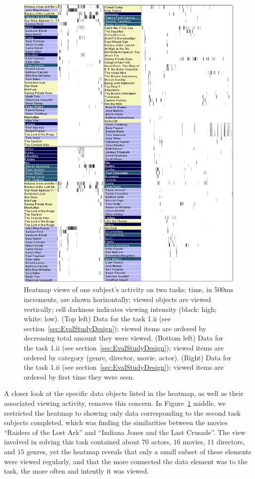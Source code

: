 \begin{figure}[!hbtp]
  \centering
  \includegraphics[width=0.75\linewidth]{images/heatmaps.eps}
  \caption{Heatmap views of one subject's activity on two tasks; time, in 500ms increments, are shown horizontally; viewed objects are viewed vertically; cell darkness indicates viewing intensity (black: high; white: low). (Top left) Data for the task 1.ii (see section~\ref{sec:EvalStudyDesign}); viewed items are ordered by decreasing total amount they were viewed. (Bottom left) Data for the task 1.ii (see section~\ref{sec:EvalStudyDesign}); viewed items are ordered by category (genre, director, movie, actor). (Right) Data for the task 1.ii (see section~\ref{sec:EvalStudyDesign}); viewed items are ordered by first time they were seen. 
}
	\label{fig:heatmap}
\end{figure}


A closer look at the specific data objects listed in the heatmap, as well as their associated viewing activity, removes this concern. In Figure~\ref{fig:heatmap} middle, we restricted the heatmap to showing only data corresponding to the second task subjects completed, which was finding the similarities between the movies ``Raiders of the Lost Ark'' and ``Indiana Jones and the Last Crusade''. The view involved in solving this task contained about $70$ actors, $16$ movies, $11$ directors, and $15$ genres, yet the heatmap reveals that only a small subset of these elements were viewed regularly, and that the more connected the data element was to the task, the more often and intently it was viewed.

